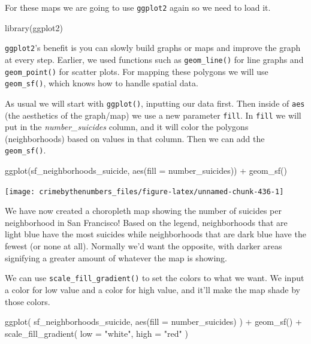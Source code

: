 \documentclass[
]{krantz}
\makeatletter
\newenvironment{Shaded}{\begin{snugshade}}{\end{snugshade}}
\newcommand{\AttributeTok}[1]{\textcolor[rgb]{0.61,0.61,0.61}{#1}}
\newcommand{\FunctionTok}[1]{\textcolor[rgb]{0,0,0}{#1}}
\newcommand{\NormalTok}[1]{#1}
\newcommand{\SpecialCharTok}[1]{\textcolor[rgb]{0,0,0}{#1}}
\newcommand{\StringTok}[1]{\textcolor[rgb]{0.5,0.5,0.5}{#1}}
\newenvironment{kframe}{%
\medskip{}
\setlength{\fboxsep}{.8em}
 \def\at@end@of@kframe{}%
 \ifinner\ifhmode%
  \def\at@end@of@kframe{\end{minipage}}%
  \begin{minipage}{\columnwidth}%
 \fi\fi%
 \def\FrameCommand##1{\hskip\@totalleftmargin \hskip-\fboxsep
 \colorbox{shadecolor}{##1}\hskip-\fboxsep
     \hskip-\linewidth \hskip-\@totalleftmargin \hskip\columnwidth}%
 \MakeFramed {\advance\hsize-\width
   \@totalleftmargin\z@ \linewidth\hsize
   \@setminipage}}%
 {\par\unskip\endMakeFramed%
 \at@end@of@kframe}
\renewenvironment{Shaded}{\begin{kframe}}{\end{kframe}}
\makeatother
\begin{document}
For these maps we are going to use \texttt{ggplot2} again so
we need to load it.

\begin{Shaded}
\begin{Highlighting}[]
\FunctionTok{library}\NormalTok{(ggplot2)}
\end{Highlighting}
\end{Shaded}

\texttt{ggplot2}'s benefit is you can slowly build graphs or
maps and improve the graph at every step. Earlier, we used
functions such as \texttt{geom\_line()} for line graphs and
\texttt{geom\_point()} for scatter plots. For mapping these
polygons we will use \texttt{geom\_sf()}, which knows how to
handle spatial data.

As usual we will start with \texttt{ggplot()}, inputting our
data first. Then inside of \texttt{aes} (the aesthetics of
the graph/map) we use a new parameter \texttt{fill}. In
\texttt{fill} we will put in the \emph{number\_suicides}
column, and it will color the polygons (neighborhoods) based
on values in that column. Then we can add the
\texttt{geom\_sf()}.

\begin{Shaded}
\begin{Highlighting}[]
\FunctionTok{ggplot}\NormalTok{(sf\_neighborhoods\_suicide, }\FunctionTok{aes}\NormalTok{(}\AttributeTok{fill =}\NormalTok{ number\_suicides)) }\SpecialCharTok{+}
  \FunctionTok{geom\_sf}\NormalTok{()}
\end{Highlighting}
\end{Shaded}

\begin{center}\texttt{[image: crimebythenumbers\_files/figure-latex/unnamed-chunk-436-1]} \end{center}

We have now created a choropleth map showing the number of
suicides per neighborhood in San Francisco! Based on the
legend, neighborhoods that are light blue have the most
suicides while neighborhoods that are dark blue have the
fewest (or none at all). Normally we'd want the opposite,
with darker areas signifying a greater amount of whatever
the map is showing.

We can use \texttt{scale\_fill\_gradient()} to set the
colors to what we want. We input a color for low value and a
color for high value, and it'll make the map shade by those
colors.

\begin{Shaded}
\begin{Highlighting}[]
\FunctionTok{ggplot}\NormalTok{(}
\NormalTok{  sf\_neighborhoods\_suicide,}
  \FunctionTok{aes}\NormalTok{(}\AttributeTok{fill =}\NormalTok{ number\_suicides)}
\NormalTok{) }\SpecialCharTok{+}
  \FunctionTok{geom\_sf}\NormalTok{() }\SpecialCharTok{+}
  \FunctionTok{scale\_fill\_gradient}\NormalTok{(}
    \AttributeTok{low =} \StringTok{"white"}\NormalTok{,}
    \AttributeTok{high =} \StringTok{"red"}
\NormalTok{  )}
\end{Highlighting}
\end{Shaded}
\end{document}
